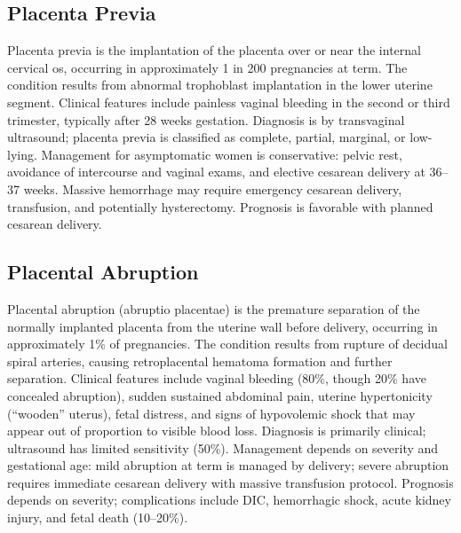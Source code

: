 \subsection{Placenta Previa}
\label{sec:Placenta Previa}
Placenta previa is the implantation of the placenta over or near the internal cervical os, occurring in approximately 1 in 200 pregnancies at term. The condition results from abnormal trophoblast implantation in the lower uterine segment. Clinical features include painless vaginal bleeding in the second or third trimester, typically after 28 weeks gestation. Diagnosis is by transvaginal ultrasound; placenta previa is classified as complete, partial, marginal, or low-lying. Management for asymptomatic women is conservative: pelvic rest, avoidance of intercourse and vaginal exams, and elective cesarean delivery at 36--37 weeks. Massive hemorrhage may require emergency cesarean delivery, transfusion, and potentially hysterectomy. Prognosis is favorable with planned cesarean delivery.

\subsection{Placental Abruption}
\label{sec:Placental Abruption}
Placental abruption (abruptio placentae) is the premature separation of the normally implanted placenta from the uterine wall before delivery, occurring in approximately 1\% of pregnancies. The condition results from rupture of decidual spiral arteries, causing retroplacental hematoma formation and further separation. Clinical features include vaginal bleeding (80\%, though 20\% have concealed abruption), sudden sustained abdominal pain, uterine hypertonicity (``wooden'' uterus), fetal distress, and signs of hypovolemic shock that may appear out of proportion to visible blood loss. Diagnosis is primarily clinical; ultrasound has limited sensitivity (50\%). Management depends on severity and gestational age: mild abruption at term is managed by delivery; severe abruption requires immediate cesarean delivery with massive transfusion protocol. Prognosis depends on severity; complications include DIC, hemorrhagic shock, acute kidney injury, and fetal death (10--20\%).


